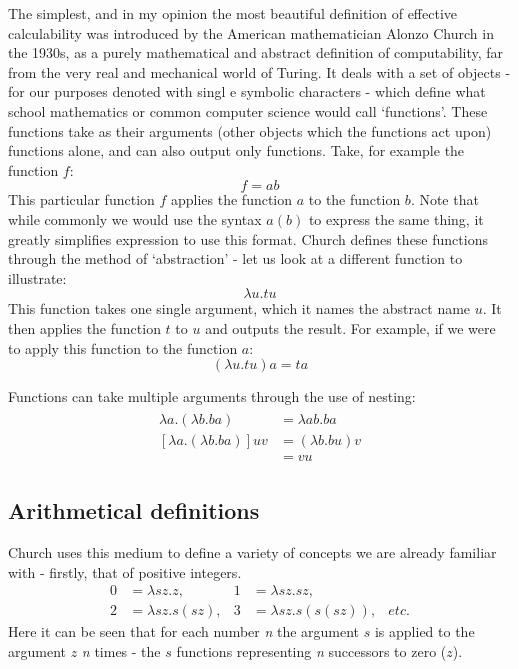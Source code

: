 \documentclass[Master.tex]{subfiles}
\begin{document}
The simplest, and in my opinion the most beautiful definition of effective calculability was introduced by the American mathematician Alonzo Church in the 1930s, as a purely mathematical and abstract definition of computability, far from the very real and mechanical world of Turing. It deals with a set of objects - for our purposes denoted with singl  e symbolic characters - which define what school mathematics or common computer science would call `functions'. These functions take as their arguments (other objects which the functions act upon) functions alone, and can also output only functions. Take, for example the function $f$:
\begin{equation*}
f = ab
\end{equation*}
This particular function $f$ applies the function $a$ to the function $b$. Note that while commonly we would use the syntax $a(b)$ to express the same thing, it greatly simplifies expression to use this format. Church defines these functions through the method of `abstraction' - let us look at a different function to illustrate:
\begin{equation*}
\lambda u.tu
\end{equation*}
This function takes one single argument, which it names the abstract name $u$. It then applies the function $t$ to $u$ and outputs the result. For example, if we were to apply this function to the function $a$:
\begin{equation*}
(\lambda u.tu) a = ta	
\end{equation*}

Functions can take multiple arguments through the use of nesting:
\begin{gather*}
\begin{aligned}
\lambda a.(\lambda b.ba) &=  \lambda ab.ba \\
[\lambda a.(\lambda b.ba)]uv &= (\lambda b.bu)v \\ &= vu
\end{aligned}
\end{gather*}

\subsection{Arithmetical definitions}

Church uses this medium to define a variety of concepts we are already familiar with - firstly, that of positive integers.
\cite{church1941lambda}
\begin{equation*}
\begin{aligned}
\bm{\mathrm{0}} &= \lambda sz.z,
  & %
\bm{\mathrm{1}} &= \lambda sz.sz,
  \\
\bm{\mathrm{2}} &= \lambda sz.s(sz),
  &
\bm{\mathrm{3}} &= \lambda sz.s(s(sz)),
  &
etc.
\end{aligned}
\end{equation*}
Here it can be seen that for each number \textit{n} the argument $s$ is applied to the argument $z$ \textit{n} times - the $s$ functions representing \textit{n} successors to zero ($z$).
\end{document}
